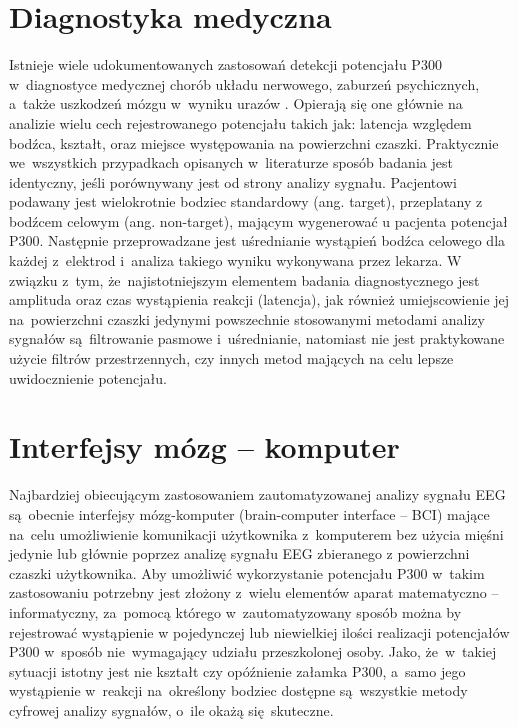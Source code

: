 \documentclass[licencjacka,openright]{pracamgr}
\begin{document}
\section{Diagnostyka medyczna}
Istnieje wiele udokumentowanych zastosowań detekcji potencjału P300 w~diagnostyce medycznej chorób układu nerwowego, zaburzeń psychicznych, a~także uszkodzeń mózgu w~wyniku urazów \citep{zgorzalewicz2000}. Opierają się one głównie na analizie wielu cech rejestrowanego potencjału takich jak: latencja względem bodźca, kształt, oraz miejsce występowania na powierzchni czaszki. Praktycznie we~wszystkich przypadkach opisanych w~literaturze sposób badania jest identyczny, jeśli porównywany jest od strony analizy sygnału. Pacjentowi podawany jest wielokrotnie bodziec standardowy (ang. target), przeplatany z bodźcem celowym (ang. non-target), mającym wygenerować u pacjenta potencjał P300. Następnie przeprowadzane jest uśrednianie wystąpień bodźca celowego dla każdej z~elektrod i~analiza takiego wyniku wykonywana przez lekarza. 
W związku z~tym, że~najistotniejszym elementem badania diagnostycznego jest amplituda oraz czas wystąpienia reakcji (latencja), jak również umiejscowienie jej na~powierzchni czaszki \citep{chudzik2004} jedynymi powszechnie stosowanymi metodami analizy sygnałów są~filtrowanie pasmowe i~uśrednianie, natomiast nie jest praktykowane użycie filtrów przestrzennych, czy innych metod mających na celu lepsze uwidocznienie potencjału.

\section{Interfejsy mózg -- komputer}
Najbardziej obiecującym zastosowaniem zautomatyzowanej analizy sygnału EEG są~obecnie interfejsy mózg-komputer (brain-computer interface -- BCI) mające na~celu umożliwienie komunikacji użytkownika z~komputerem bez użycia mięśni jedynie lub głównie poprzez analizę sygnału EEG zbieranego z powierzchni czaszki użytkownika. Aby umożliwić wykorzystanie potencjału P300 w~takim zastosowaniu potrzebny jest złożony z~wielu elementów aparat matematyczno -- informatyczny, za~pomocą którego w~zautomatyzowany sposób można by rejestrować wystąpienie w pojedynczej lub niewielkiej ilości realizacji potencjałów P300 w~sposób nie~wymagający udziału przeszkolonej osoby. Jako, że~w~takiej sytuacji istotny jest nie kształt czy opóźnienie załamka P300, a~samo jego wystąpienie w~reakcji na~określony bodziec dostępne są~wszystkie metody cyfrowej analizy sygnałów, o~ile okażą się~skuteczne.
\end{document}
